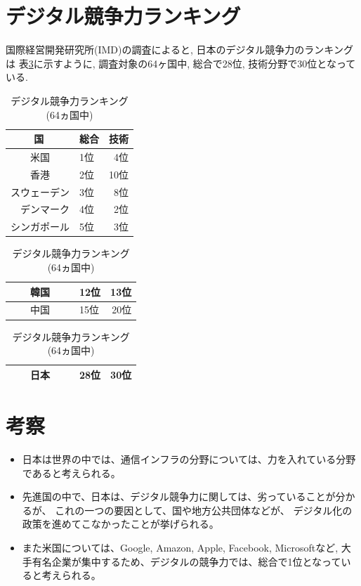 \documentclass[a4paper,11pt,dvipdfmx]{ujarticle}
\begin{document}
\section{デジタル競争力ランキング}
国際経営開発研究所(IMD)の調査\cite{imd}によると, 日本のデジタル競争力のランキングは
表\ref{tbl:利用状況}に示すように, 調査対象の64ヶ国中, 総合で28位, 技術分野で30位となっている.
\begin{table}[htbp]
    \centering
    \caption{デジタル競争力ランキング(64ヵ国中)}
    \label{tbl:利用状況}

   \begin{tabular}{|l|l|r|}\hline
        　　 国 　　 & 総合 & 技術\\
        \hline
        　　米国　　 & 1位& 4位\\
        \hline
        　　香港　　& 2位 & 10位\\
        \hline
        スウェーデン& 3位 & 8位\\
        \hline
        　デンマーク& 4位 & 2位 \\
        \hline
        シンガポール& 5位 & 3位\\
        \hline
    \end{tabular}

     \begin{tabular}{|l|l|r|}\hline
        　　韓国　　\centering & 12位 & 13位\\
        \hline 
        　　中国　　& 15位 & 20位\\
        \hline
    \end{tabular}

    \begin{tabular}{|l|l|r|}\hline
        　　日本　　\centering & 28位 & 30位\\
        \hline
    \end{tabular} 

\end{table}

\section{考察}
\begin{itemize}
    \item 日本は世界の中では、通信インフラの分野については、力を入れている分野であると考えられる。
    \item 先進国の中で、日本は、デジタル競争力に関しては、劣っていることが分かるが、
    これの一つの要因として、国や地方公共団体などが、
    デジタル化の政策を進めてこなかったことが挙げられる。
    \item また米国については、Google, Amazon, Apple, Facebook, Microsoftなど,
    大手有名企業が集中するため、デジタルの競争力では、総合で1位となっていると考えられる。
\end{itemize}
\end{document}
